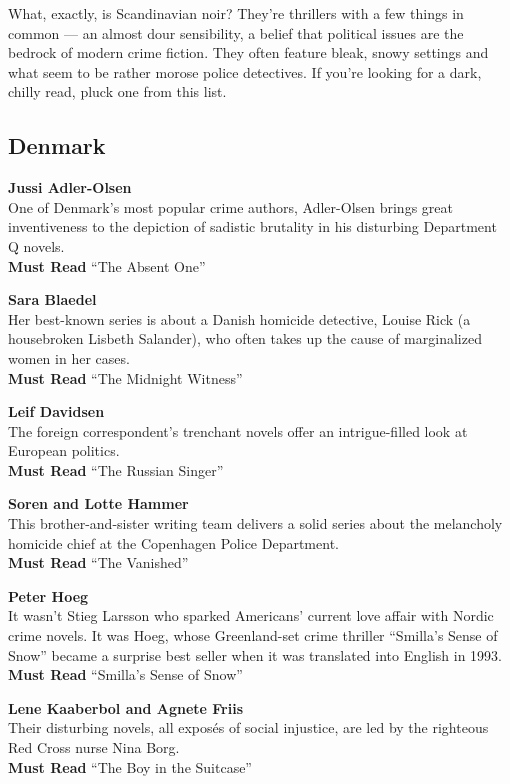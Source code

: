 What, exactly, is Scandinavian noir? They're thrillers with a few things
in common --- an almost dour sensibility, a belief that political issues
are the bedrock of modern crime fiction. They often feature bleak, snowy
settings and what seem to be rather morose police detectives. If you're
looking for a dark, chilly read, pluck one from this list.

\hypertarget{denmark}{%
\subsection{Denmark}\label{denmark}}

\textbf{Jussi Adler-Olsen}\\
One of Denmark's most popular crime authors, Adler-Olsen brings great
inventiveness to the depiction of sadistic brutality in his disturbing
Department Q novels.\\
\textbf{Must Read} ``The Absent One''

\textbf{Sara Blaedel}\\
Her best-known series is about a Danish homicide detective, Louise Rick
(a housebroken Lisbeth Salander), who often takes up the cause of
marginalized women in her cases.\\
\textbf{Must Read} ``The Midnight Witness''

\textbf{Leif Davidsen}\\
The foreign correspondent's trenchant novels offer an intrigue-filled
look at European politics.\\
\textbf{Must Read} ``The Russian Singer''

\textbf{Soren and Lotte Hammer}\\
This brother-and-sister writing team delivers a solid series about the
melancholy homicide chief at the Copenhagen Police Department.\\
\textbf{Must Read} ``The Vanished''

\textbf{Peter Hoeg}\\
It wasn't Stieg Larsson who sparked Americans' current love affair with
Nordic crime novels. It was Hoeg, whose Greenland-set crime thriller
``Smilla's Sense of Snow'' became a surprise best seller when it was
translated into English in 1993.\\
\textbf{Must Read} ``Smilla's Sense of Snow''

\textbf{Lene Kaaberbol and Agnete Friis}\\
Their disturbing novels, all exposés of social injustice, are led by the
righteous Red Cross nurse Nina Borg.\\
\textbf{Must Read} ``The Boy in the Suitcase''

